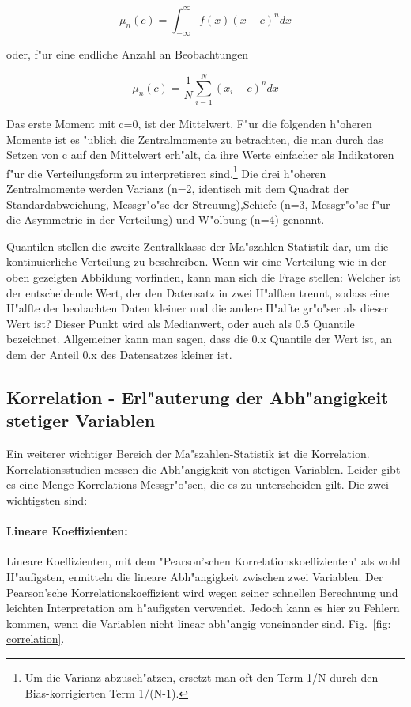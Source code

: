 \documentclass[a4paper,twoside]{tufte-book}\usepackage[]{graphicx}\usepackage[]{color}
\begin{document}
\begin{equation}
\mu_n(c) = \int_{-\infty}^{\infty} f(x) (x - c)^n dx
\end{equation}

oder, f"ur eine endliche Anzahl an Beobachtungen 

\begin{equation}
\mu_n(c) = \frac{1}{N}\sum_{i=1}^N (x_i - c)^n dx
\end{equation}

Das erste Moment mit c=0, ist der Mittelwert. F"ur die folgenden h"oheren Momente ist es "ublich die Zentralmomente zu betrachten, die man durch das Setzen von c auf den Mittelwert erh"alt, da ihre Werte einfacher als Indikatoren f"ur die Verteilungsform zu interpretieren sind.\footnote{Um die Varianz abzusch"atzen, ersetzt man oft den Term 1/N durch den Bias-korrigierten Term 1/(N-1).} Die drei h"oheren Zentralmomente werden Varianz (n=2, identisch mit dem Quadrat der Standardabweichung, Messgr"o"se der Streuung),Schiefe (n=3, Messgr"o"se f"ur die Asymmetrie in der Verteilung) und W"olbung (n=4) genannt. 

Quantilen stellen die zweite Zentralklasse der Ma"szahlen-Statistik dar, um die kontinuierliche Verteilung zu beschreiben. Wenn wir eine Verteilung wie in der oben gezeigten Abbildung vorfinden, kann man sich die Frage stellen: Welcher ist der entscheidende Wert, der den Datensatz in zwei H"alften trennt, sodass eine H"alfte der beobachten Daten kleiner und die andere H"alfte gr"o"ser als dieser Wert ist? Dieser Punkt wird als Medianwert, oder auch als 0.5 Quantile bezeichnet. Allgemeiner kann man sagen, dass die 0.x Quantile der Wert ist, an dem der Anteil 0.x des Datensatzes kleiner ist. 

\subsection{Korrelation - Erl"auterung der Abh"angigkeit stetiger Variablen}

Ein weiterer wichtiger Bereich der Ma"szahlen-Statistik ist die Korrelation. Korrelationsstudien messen die Abh"angigkeit von stetigen Variablen. Leider gibt es eine Menge Korrelations-Messgr"o"sen, die es zu unterscheiden gilt. Die zwei wichtigsten sind:

\paragraph{Lineare Koeffizienten:}Lineare Koeffizienten, mit dem "Pearson'schen Korrelationskoeffizienten" als wohl H"aufigsten, ermitteln die lineare Abh"angigkeit zwischen zwei Variablen. Der Pearson'sche Korrelationskoeffizient wird wegen seiner schnellen Berechnung und leichten Interpretation am h"aufigsten verwendet. Jedoch kann es hier zu Fehlern kommen, wenn die Variablen nicht linear abh"angig voneinander sind. Fig.~\ref{fig: correlation}.
\end{document}
